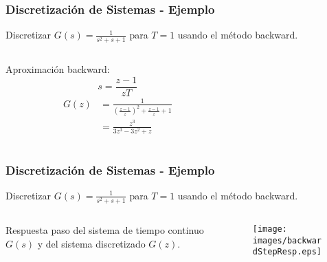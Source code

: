 \documentclass[aspectratio=169]{beamer}
\theoremstyle{definition}
\theoremstyle{plain}
\theoremstyle{remark}
\begin{document}
\begin{frame}[c]\frametitle{Discretización de Sistemas - Ejemplo}
	\vspace*{3mm}	
	Discretizar $G(s) = \frac{1}{s^2 + s + 1}$ para $T=1$ usando el método backward.\\
	\pause
	\vspace*{4mm}
	\begin{columns}
		\begin{column}{0.3\textwidth}
			Aproximación backward:
			\begin{equation*}
				s = \frac{z-1}{zT}
			\end{equation*}
			\pause
			\begin{align*}
				G(z) &= \frac{1}{\left(\frac{z-1}{z}\right)^2 + \frac{z-1}{z} + 1}\\
				&= \frac{z^3}{3z^3-3z^2+z}
			\end{align*}
		\end{column}
		\pause
		\begin{column}{0.7\textwidth}
			
		\end{column}
	\end{columns}
\end{frame}

\begin{frame}[c]\frametitle{Discretización de Sistemas - Ejemplo}
	\vspace*{3mm}	
	Discretizar $G(s) = \frac{1}{s^2 + s + 1}$ para $T=1$ usando el método backward.\\
	\begin{columns}
		\begin{column}{0.3\textwidth}
			Respuesta paso del sistema de tiempo continuo $G(s)$ y del sistema discretizado $G(z)$.
		\end{column}
		\begin{column}{0.7\textwidth}
			\begin{figure}
				\centering
				\texttt{[image: images/backwardStepResp.eps]}
			\end{figure}
		\end{column}
	\end{columns}
\end{frame}
\end{document}
